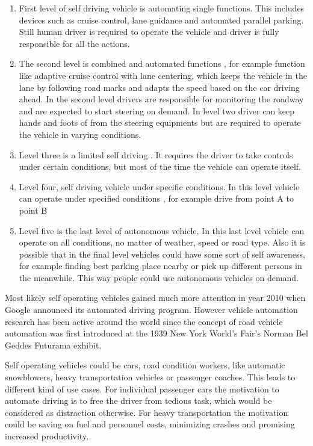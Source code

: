 \documentclass[english]{tktltiki}
\begin{document}
\begin{enumerate}
\item
First level of self 
driving vehicle is automating single functions. This includes devices such as 
cruise control, lane guidance and automated parallel parking. 
Still human driver is required to operate the vehicle and 
driver is fully responsible for all the actions.
\item
The second level is combined and automated functions \cite{transportpolicy}, for example function like 
adaptive cruise control with lane centering, which keeps the vehicle in the lane 
by following road marks and adapts the speed based on the car driving ahead. In 
the second level drivers are responsible for monitoring the roadway and are 
expected to start steering on demand. In level two driver can keep hands and 
foots of from the steering equipments but are required to operate the vehicle in 
varying conditions.
\item
Level three is a limited self driving \cite{transportpolicy}. It requires the driver to take controls 
under certain conditions, but most of the time the vehicle can operate itself. 
\item
Level four, self driving vehicle under specific conditions. In this level 
vehicle can operate under specified conditions \cite{transportpolicy}, for example drive from point A 
to point B
\item
Level five is the last level of autonomous vehicle. In this last level vehicle 
can operate on all conditions, no matter of weather, speed or road type. 
\cite{transportpolicy} Also it is possible that in the final level vehicles 
could have some sort of self awareness, for example finding best parking place 
nearby or pick up different persons in the meanwhile. This way people could use 
autonomous vehicles on demand.
\end{enumerate}

Most likely self operating vehicles gained much more attention in year 2010 when 
Google announced its automated driving program. \cite{heavyvehicle} However vehicle automation 
research has been active around the world since the concept of road vehicle 
automation was first introduced at the 1939 New York World's Fair's Norman Bel 
Geddes Futurama exhibit.

Self operating vehicles could be cars, road condition workers, like automatic 
snowblowers, heavy transportation vehicles or passenger coaches. This leads to 
different kind of use cases. For individual passenger cars the motivation to 
automate driving is to free the driver from tedious task, \cite{heavyvehicle} which would be 
considered as distraction otherwise. For heavy transportation the motivation 
could be saving on fuel and personnel costs, minimizing crashes and promising 
increased productivity.
\end{document}
